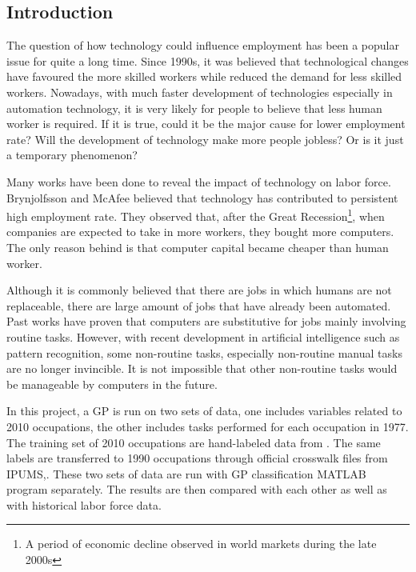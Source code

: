 \documentclass[11pt]{report}
\numberwithin{equation}{chapter}
\begin{document}
\begin{spacing}{2}

\newpage
{}
\setcounter{page}{1}



\chapter{Introduction}
The question of how technology could influence employment has been a popular issue for quite a long time\cite{machin1998}. Since 1990s, it was believed that technological changes have favoured the more skilled workers while reduced the demand for less skilled workers\cite{bound1989changes}. Nowadays, with much faster development of technologies especially in automation technology, it is very likely for people to believe that less human worker is required. If it is true, could it be the major cause for lower employment rate? Will the development of technology make more people jobless? Or is it just a temporary phenomenon? 

Many works have been done to reveal the impact of technology on labor force. Brynjolfsson and McAfee\cite{brynjolfsson2012race} believed that technology has contributed to persistent high employment rate. They observed that, after the Great Recession\footnote{A period of economic decline observed in world markets during the late 2000s}, when companies are expected to take in more workers, they bought more computers. The only reason behind is that computer capital became cheaper than human worker. 

Although it is commonly believed that there are jobs in which humans are not replaceable\cite{levy2012new}, there are large amount of jobs that have already been automated. Past works have proven that computers are substitutive for jobs mainly involving routine tasks\cite{david2001skill}. However, with recent development in artificial intelligence such as pattern recognition, some non-routine tasks, especially non-routine manual tasks are no longer invincible.  It is not impossible that other non-routine tasks would be manageable by computers in the future.

In this project, a GP is run on two sets of data, one includes variables related to 2010 occupations, the other includes tasks performed for each occupation in 1977\cite{david2001skill}. The training set of 2010 occupations are hand-labeled data from \cite{frey2013future}. The same labels are transferred to 1990 occupations through official crosswalk files from IPUMS\cite{SOC2010_2000},\cite{SOC2000_OCC}\cite{OCC2000_1990}. These two sets of data are run with GP classification MATLAB program separately. The results are then compared with each other as well as with historical labor force data\cite{IPUMS1990}. 


\end{spacing}
\end{document}
